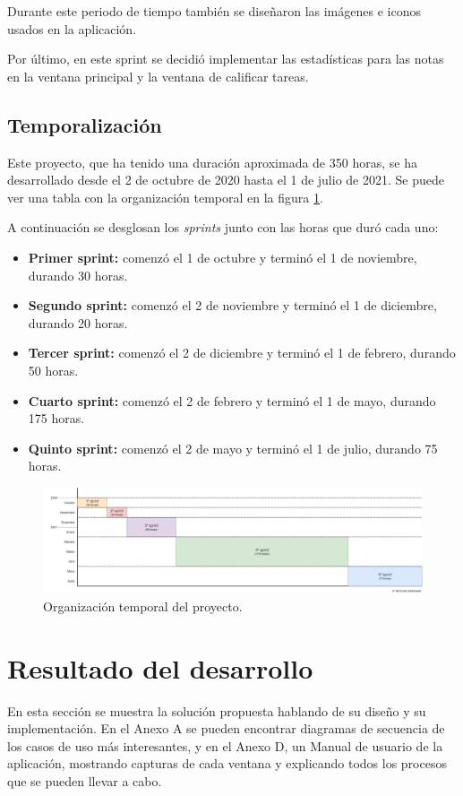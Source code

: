 Durante este periodo de tiempo también se diseñaron las imágenes e iconos usados en la aplicación.

Por último, en este sprint se decidió implementar las estadísticas para las notas en la ventana principal y la ventana de calificar tareas.

\subsection{Temporalización}
Este proyecto, que ha tenido una duración aproximada de 350 horas, se ha desarrollado desde el 2 de octubre de 2020 hasta el 1 de julio de 2021. Se puede ver una tabla con la organización temporal en la figura \ref{Fig:timeline}.

A continuación se desglosan los \textit{sprints} junto con las horas que duró cada uno:
\begin{itemize}
	\item \textbf{Primer sprint:} comenzó el 1 de octubre y terminó el 1 de noviembre, durando 30 horas.
	\item \textbf{Segundo sprint:} comenzó el 2 de noviembre y terminó el 1 de diciembre, durando 20 horas.
	\item \textbf{Tercer sprint:} comenzó el 2 de diciembre y terminó el 1 de febrero, durando 50 horas.
	\item \textbf{Cuarto sprint:} comenzó el 2 de febrero y terminó el 1 de mayo, durando 175 horas.
	\item\textbf{ Quinto sprint:} comenzó el 2 de mayo y terminó el 1 de julio, durando 75 horas.
\end{itemize}

\begin{figure}[H]
\centering\includegraphics[width=1\linewidth]{figs/timeline.png}
\caption{Organización temporal del proyecto.}
\label{Fig:timeline}
\end{figure}

\section{Resultado del desarrollo}
En esta sección se muestra la solución propuesta hablando de su diseño y su implementación.
En el Anexo A se pueden encontrar diagramas de secuencia de los casos de uso más interesantes, y en el Anexo D, un Manual de usuario de la aplicación, mostrando capturas de cada ventana y explicando todos los procesos que se pueden llevar a cabo.

